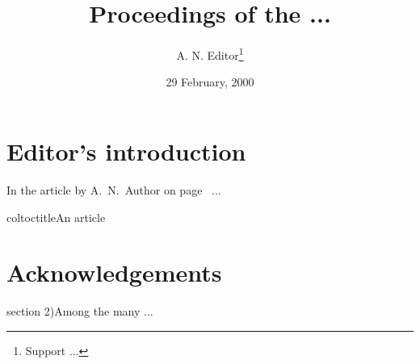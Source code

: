 \documentclass[colclass=jote-article]{combine}
\title{Proceedings of the ...}
\author{A. N. Editor\thanks{Support ...}}
\date{29 February, 2000}
\begin{document}
\pagestyle{combine}      
\maketitle               
\tableofcontents     
\clearpage
\section{Editor’s introduction} \label{intro}  
In the article by A.~N.~Author on page~\pageref{art1} ...

\begin{papers}                  %
coltoctitle{An article}        
\label{art1}                   %
\label{}
%
\end{papers}                    %
\section{Acknowledgements}      %
section 2)Among the many ...
\end{document}

